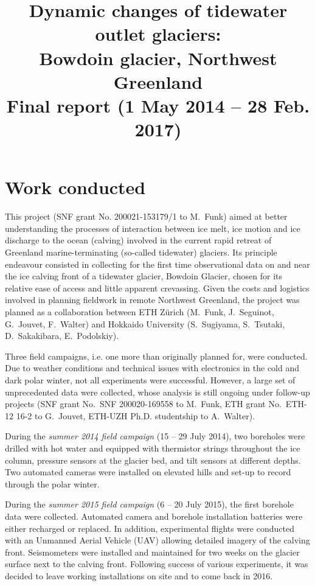 \documentclass{article}
\title{Dynamic changes of tidewater outlet glaciers:\\
       Bowdoin glacier, Northwest Greenland\\\bigskip
       \large Final report (1 May 2014 -- 28 Feb. 2017)}
\author{}
\date{}
\begin{document}

\maketitle

\section{Work conducted}

This project (SNF grant No. 200021-153179/1 to M.~Funk) aimed at better
understanding the processes of interaction between ice melt, ice motion and ice
discharge to the ocean (calving) involved in the current rapid retreat of
Greenland marine-terminating (so-called tidewater) glaciers. Its principle
endeavour consisted in collecting for the first time observational data on and
near the ice calving front of a tidewater glacier, Bowdoin Glacier, chosen for
its relative ease of access and little apparent crevassing. Given the costs and
logistics involved in planning fieldwork in remote Northwest Greenland, the
project was planned as a collaboration between ETH Zürich (M.~Funk,
J.~Seguinot, G.~Jouvet, F.~Walter) and Hokkaido University (S.~Sugiyama,
S.~Tsutaki, D.~Sakakibara, E.~Podolskiy).

Three field campaigns, i.e. one more than originally planned for, were
conducted. Due to weather conditions and technical issues with electronics in
the cold and dark polar winter, not all experiments were successful. However, a
large set of unprecedented data were collected, whose analysis is still ongoing
under follow-up projects (SNF grant No.~SNF 200020-169558 to M.~Funk, ETH grant
No.~ETH-12 16-2 to G.~Jouvet, ETH-UZH Ph.D. studentship to A.~Walter).

During the \emph{summer 2014 field campaign} (15 -- 29 July 2014), two
boreholes were drilled with hot water and equipped with thermistor strings
throughout the ice column, pressure sensors at the glacier bed, and
tilt sensors at different depths. Two automated cameras were installed on
elevated hills and set-up to record through the polar winter.

During the \emph{summer 2015 field campaign} (6 -- 20 July 2015), the first
borehole data were collected. Automated camera and borehole installation
batteries were either recharged or replaced. In addition, experimental flights
were conducted with an Unmanned Aerial Vehicle (UAV) allowing detailed imagery
of the calving front. Seismometers were installed and maintained for two weeks
on the glacier surface next to the calving front. Following success of various
experiments, it was decided to leave working installations on site and to come
back in 2016.
\end{document}
